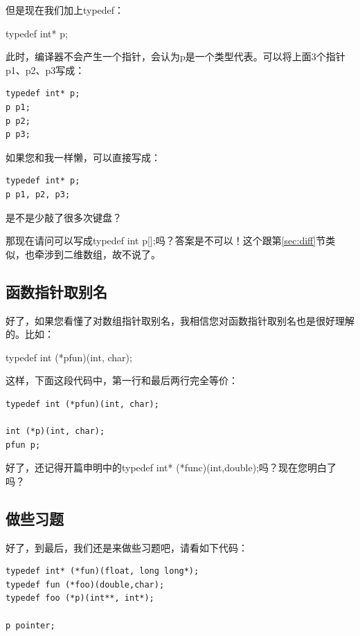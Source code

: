 \documentclass[11pt,twoside,a4paper,titlepage]{article}	%
\begin{document}
但是现在我们加上typedef：
\begin{center}
{\color{blue}typedef} {\color{violet}int* p};
\end{center}

此时，编译器不会产生一个指针，会认为p是一个类型代表。可以将上面3个指针p1、p2、p3写成：

\begin{lstlisting}
typedef int* p;
p p1;
p p2;
p p3;
\end{lstlisting}

如果您和我一样懒，可以直接写成：
\begin{lstlisting}
typedef int* p;
p p1, p2, p3;
\end{lstlisting}

是不是少敲了很多次键盘？

那现在请问可以写成{\color{blue}typedef} {\color{violet}int p[]};吗？答案是不可以！这个跟第\ref{sec:diff}节类似，也牵涉到二维数组，故不说了。

\subsection{函数指针取别名}
好了，如果您看懂了对数组指针取别名，我相信您对函数指针取别名也是很好理解的。比如：
\begin{center}
{\color{blue}typedef} {\color{violet}int (*pfun)(int, char)};
\end{center}

这样，下面这段代码中，第一行和最后两行完全等价：

\begin{lstlisting}
typedef int (*pfun)(int, char);

int (*p)(int, char);
pfun p;
\end{lstlisting}

好了，还记得开篇申明中的{\color{blue}typedef} {\color{violet}int* }{\color{black}(*func)}{\color{violet}(int,double)};吗？现在您明白了吗？

\subsection{做些习题}
好了，到最后，我们还是来做些习题吧，请看如下代码：

\begin{lstlisting}
typedef int* (*fun)(float, long long*);
typedef fun (*foo)(double,char);
typedef foo (*p)(int**, int*);

p pointer;
\end{lstlisting}
\end{document}
